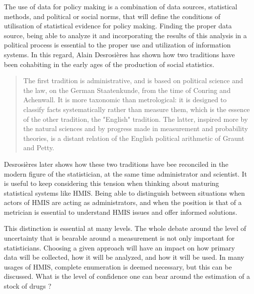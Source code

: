 The use of data for policy making is a combination of data sources, statistical methods, and political or social norms, that will define the conditions of utilisation of statistical evidence for policy making. Finding the proper data source, being able to analyze it and incorporating the results of this analysis in a political process is essential to the proper use and utilization of information systems. In this regard, Alain Desrosières has shown how two traditions have been cohabiting in the early ages of the production of social statistics\cite{admin_savant}.



\begin{quote}
The first tradition is administrative, and is based on political science and the law, on the German Staatenkunde, from the time of Conring and Achenwall. It is more taxonomic than metrological: it is designed to classify facts systematically rather than measure them, which is the essence of the other tradition, the "English" tradition. The latter, inspired more by the natural sciences and by progress made in measurement and probability theories, is a distant relation of the English political arithmetic of Graunt and Petty.
\end{quote}

Desrosières later shows how these two traditions have bee reconciled in the modern figure of the statistician, at the same time administrator and scientist. It is useful to keep considering this tension when thinking about maturing statistical systems like HMIS. Being able to distinguish between situations when actors of HMIS are acting as administrators, and when the position is that of a metrician is essential to understand HMIS issues and offer informed solutions.

This distinction is essential at many levels. The whole debate around the level of uncertainty that is bearable around a measurement is not only important for statisticians. Choosing a given approach will have an impact on how primary data will be collected, how it will be analyzed, and how it will be used. In many usages of HMIS, complete enumeration is deemed necessary, but this can be discussed. What is the level of confidence one can bear around the estimation of a stock of drugs ?

